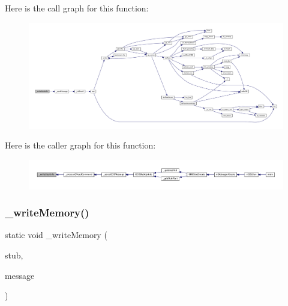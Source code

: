 Here is the call graph for this function\+:
\nopagebreak
\begin{figure}[H]
\begin{center}
\leavevmode
\includegraphics[width=350pt]{gdb-stub_8c_abf80181e6f4f0b39c329b802fa1cae95_cgraph}
\end{center}
\end{figure}
Here is the caller graph for this function\+:
\nopagebreak
\begin{figure}[H]
\begin{center}
\leavevmode
\includegraphics[width=350pt]{gdb-stub_8c_abf80181e6f4f0b39c329b802fa1cae95_icgraph}
\end{center}
\end{figure}
\mbox{\label{gdb-stub_8c_a4e6946316c1b882a919c3839f12b6c85}} 
\subsubsection{\texorpdfstring{\+\_\+write\+Memory()}{\_writeMemory()}}
{\footnotesize\ttfamily static void \+\_\+write\+Memory (\begin{DoxyParamCaption}\item[{struct G\+D\+B\+Stub $\ast$}]{stub,  }\item[{const char $\ast$}]{message }\end{DoxyParamCaption})\hspace{0.3cm}{\ttfamily [static]}}

